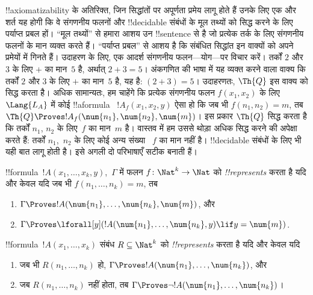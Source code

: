 \documentclass[../../../include/open-logic-section]{subfiles}
\begin{document}
!!{axiomatizability} के अतिरिक्त, जिन सिद्धांतों पर अपूर्णता प्रमेय लागू होते
हैं उनके लिए एक और शर्त यह होगी कि वे संगणनीय फलनों और !!{decidable} संबंधों
के मूल तथ्यों को सिद्ध करने के लिए पर्याप्त प्रबल हों। ``मूल तथ्यों'' से
हमारा आशय उन !!{sentence} से है जो प्रत्येक तर्क के लिए संगणनीय फलनों के मान
व्यक्त करते हैं। ``पर्याप्त प्रबल'' से आशय है कि संबंधित सिद्धांत इन वाक्यों
को अपने प्रमेयों में गिनते हैं। उदाहरण के लिए, एक आदर्श संगणनीय फलन—योग—पर
विचार करें। तर्कों $2$ और $3$ के लिए $+$ का मान~$5$ है, अर्थात् $2+3 = 5$।
अंकगणित की भाषा में यह व्यक्त करने वाला वाक्य कि तर्कों $2$ और $3$ के लिए
$+$ का मान~$5$ है, यह है: $(\num{2} + \num{3}) = \num{5}$। उदाहरणतः,
$\Th{Q}$ इस वाक्य को सिद्ध करता है। अधिक सामान्यतः, हम चाहेंगे कि प्रत्येक
संगणनीय फलन $f(x_1, x_2)$ के लिए~$\Lang{L_A}$ में कोई !!a{formula}
~$!A_f(x_1, x_2, y)$ ऐसा हो कि जब भी $f(n_1, n_2) = m$, तब $\Th{Q} \Proves
!A_f(\num{n_1}, \num{n_2}, \num{m})$। इस प्रकार $\Th{Q}$ सिद्ध करता है कि
तर्कों $n_1$, $n_2$ के लिए~$f$ का मान~$m$ है। वास्तव में हम उससे थोड़ा अधिक
सिद्ध करने की अपेक्षा करते हैं: तर्कों $n_1$,~$n_2$ के लिए कोई अन्य संख्या
~$f$ का मान नहीं है। !!{decidable} संबंधों के लिए भी यही बात लागू होती है।
इसे अगली दो परिभाषाएँ सटीक बनाती हैं।

\begin{defn}
!!{formula}~$!A(x_1, \dots, x_k, y)$,~$\Gamma$ में फलन $f\colon \Nat^k \to
\Nat$ को \emph{!!{represents}} करता है यदि और केवल यदि जब भी $f(n_1,
\dots, n_k) = m$, तब
\begin{enumerate}
\item $\Gamma \Proves !A(\num{n_1}, \dots, \num{n_k}, \num{m})$, और
\item $\Gamma \Proves \lforall[y](!A(\num{n_1}, \dots, \num{n_k},
y) \lif y = \num{m})$.
\end{enumerate}
\end{defn}

\begin{defn}
!!{formula}~$!A(x_1, \dots, x_k)$ संबंध $R \subseteq \Nat^k$ को
\emph{!!{represents}} करता है यदि और केवल यदि
\begin{enumerate}
\item जब भी $R(n_1, \dots, n_k)$ हो, $\Gamma \Proves !A(\num{n_1},
\dots, \num{n_k})$, और
\item जब $R(n_1, \dots, n_k)$ नहीं होता, तब $\Gamma \Proves \lnot
!A(\num{n_1}, \dots, \num{n_k})$।
\end{enumerate}
\end{defn}
\end{document}

